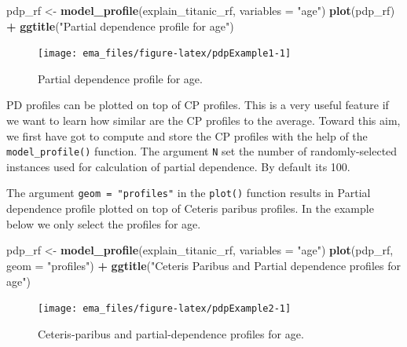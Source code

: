 \documentclass[]{krantz}
\newenvironment{Shaded}{\begin{snugshade}}{\end{snugshade}}
\newcommand{\DataTypeTok}[1]{\textcolor[rgb]{0.13,0.29,0.53}{#1}}
\newcommand{\KeywordTok}[1]{\textcolor[rgb]{0.13,0.29,0.53}{\textbf{#1}}}
\newcommand{\NormalTok}[1]{#1}
\newcommand{\OperatorTok}[1]{\textcolor[rgb]{0.81,0.36,0.00}{\textbf{#1}}}
\newcommand{\StringTok}[1]{\textcolor[rgb]{0.31,0.60,0.02}{#1}}
\begin{document}
\begin{Shaded}
\begin{Highlighting}[]
\NormalTok{pdp_rf <-}\StringTok{ }\KeywordTok{model_profile}\NormalTok{(explain_titanic_rf, }\DataTypeTok{variables =} \StringTok{"age"}\NormalTok{)}
\KeywordTok{plot}\NormalTok{(pdp_rf) }\OperatorTok{+}
\StringTok{  }\KeywordTok{ggtitle}\NormalTok{(}\StringTok{"Partial dependence profile for age"}\NormalTok{) }
\end{Highlighting}
\end{Shaded}

\begin{figure}

{\centering \texttt{[image: ema\_files/figure-latex/pdpExample1-1]} 

}

\caption{Partial dependence profile for age.}\label{fig:pdpExample1}
\end{figure}

PD profiles can be plotted on top of CP profiles. This is a very useful feature if we want to learn how similar are the CP profiles to the average. Toward this aim, we first have got to compute and store the CP profiles with the help of the \texttt{model\_profile()} function. The argument \texttt{N} set the number of randomly-selected instances used for calculation of partial dependence. By default its 100.

The argument \texttt{geom\ =\ "profiles"} in the \texttt{plot()} function results in Partial dependence profile plotted on top of Ceteris paribus profiles. In the example below we only select the profiles for age.

\begin{Shaded}
\begin{Highlighting}[]
\NormalTok{pdp_rf <-}\StringTok{ }\KeywordTok{model_profile}\NormalTok{(explain_titanic_rf, }\DataTypeTok{variables =} \StringTok{"age"}\NormalTok{)}
\KeywordTok{plot}\NormalTok{(pdp_rf, }\DataTypeTok{geom =} \StringTok{"profiles"}\NormalTok{) }\OperatorTok{+}
\StringTok{  }\KeywordTok{ggtitle}\NormalTok{(}\StringTok{"Ceteris Paribus and Partial dependence profiles for age"}\NormalTok{) }
\end{Highlighting}
\end{Shaded}

\begin{figure}

{\centering \texttt{[image: ema\_files/figure-latex/pdpExample2-1]} 

}

\caption{Ceteris-paribus and partial-dependence profiles for age.}\label{fig:pdpExample2}
\end{figure}
\end{document}
